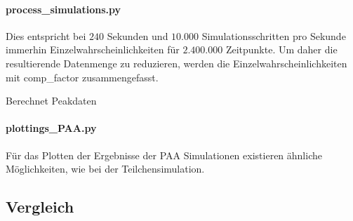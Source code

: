 \paragraph{process\_simulations.py}

Dies entspricht bei $240$ Sekunden und $10.000$ Simulationsschritten pro Sekunde immerhin Einzelwahrscheinlichkeiten für $2.400.000$ Zeitpunkte. Um daher die resultierende Datenmenge zu reduzieren, werden die Einzelwahrscheinlichkeiten mit comp\_factor zusammengefasst.

Berechnet Peakdaten

\paragraph{plottings\_PAA.py}
Für das Plotten der Ergebnisse der PAA Simulationen existieren ähnliche Möglichkeiten, wie bei der Teilchensimulation.


\subsection{Vergleich}

